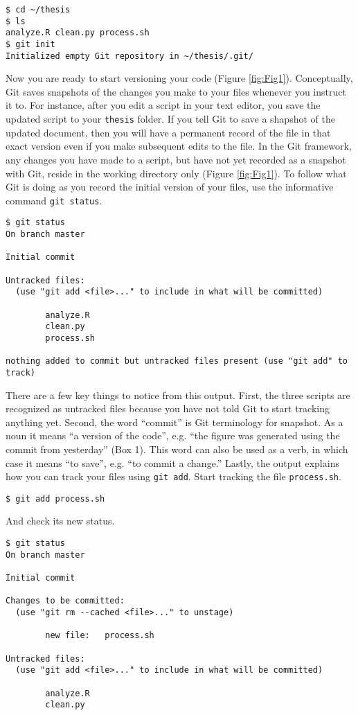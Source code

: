 \begin{verbatim}
$ cd ~/thesis
$ ls
analyze.R clean.py process.sh
$ git init
Initialized empty Git repository in ~/thesis/.git/
\end{verbatim}

Now you are ready to start versioning your code (Figure \ref{fig:Fig1}).
Conceptually, Git saves snapshots of the changes you make to your files whenever you instruct it to.
For instance, after you edit a script in your text editor, you save the updated script to your \verb|thesis| folder.
If you tell Git to save a shapshot of the updated document, then you will have a permanent record of the file in that exact version even if you make subsequent edits to the file.
In the Git framework, any changes you have made to a script, but have not yet recorded as a snapshot with Git, reside in the working directory only (Figure \ref{fig:Fig1}).
To follow what Git is doing as you record the initial version of your files, use the informative command \verb|git status|.

\begin{verbatim}
$ git status
On branch master

Initial commit

Untracked files:
  (use "git add <file>..." to include in what will be committed)

        analyze.R
        clean.py
        process.sh

nothing added to commit but untracked files present (use "git add" to track)
\end{verbatim}

There are a few key things to notice from this output.
First, the three scripts are recognized as untracked files because you have not told Git to start tracking anything yet.
Second, the word ``commit'' is Git terminology for snapshot.
As a noun it means ``a version of the code'', e.g. ``the figure was generated using the commit from yesterday'' (Box 1).
This word can also be used as a verb, in which case it means ``to save'', e.g. ``to commit a change.''
Lastly, the output explains how you can track your files using \verb|git add|.
Start tracking the file \verb|process.sh|.

\begin{verbatim}
$ git add process.sh
\end{verbatim}

And check its new status.

\begin{verbatim}
$ git status
On branch master

Initial commit

Changes to be committed:
  (use "git rm --cached <file>..." to unstage)

        new file:   process.sh

Untracked files:
  (use "git add <file>..." to include in what will be committed)

        analyze.R
        clean.py
\end{verbatim}

